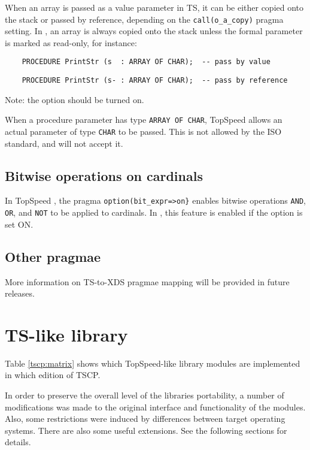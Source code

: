     When an array is passed as a value parameter in TS, it can be either copied
    onto the stack or passed by reference, depending on the \verb'call(o_a_copy)'
    pragma setting. In \xds{}, an array is always copied onto the stack unless the
    formal parameter is marked as read-only, for instance:

\verb'    PROCEDURE PrintStr (s  : ARRAY OF CHAR);  -- pass by value'

\verb'    PROCEDURE PrintStr (s- : ARRAY OF CHAR);  -- pass by reference'

    Note: the  option should be turned on.

    When a procedure parameter has type \verb'ARRAY OF CHAR', TopSpeed allows an
    actual parameter of type \verb'CHAR' to be passed. This is not allowed by
    the ISO standard, and \xds{} will not accept it.

\subsection{Bitwise operations on cardinals}

    In TopSpeed \mt{}, the pragma \verb'option(bit_expr=>on}' enables
    bitwise operations \verb'AND', \verb'OR', and \verb'NOT' to be applied
    to cardinals. In \XDS{}, this feature is enabled if the 
    option is set ON.

\subsection{Other pragmae}

    More information on TS-to-XDS pragmae mapping will be provided in future releases.

\pagebreak

\section{\xds{} TS-like library}
\label{tscp:lib}

Table \ref{tscp:matrix} shows which TopSpeed-like library modules are implemented
in which edition of TSCP.

In order to preserve the overall level of the \xds{} libraries portability,
a number of modifications was made to the original interface and functionality of the
modules. Also, some restrictions were induced by differences between target
operating systems. There are also some useful extensions. See the following sections
for details.

